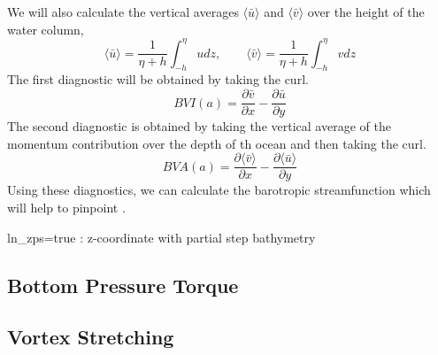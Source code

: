 \documentclass[..\EOYR.tex]{subfiles}
\begin{document}
We will also calculate the vertical averages $\langle\bar{u}\rangle$ and $\langle\bar{v}\rangle$ over the height of the water column, 
\begin{equation}
	\langle\bar{u}\rangle = \frac{1}{\eta + h}\int_{-h}^{\eta}u dz ,\qquad \langle\bar{v}\rangle = \frac{1}{\eta + h}\int_{-h}^{\eta}v dz
\end{equation}
The first diagnostic will be obtained by taking  the curl.
\begin{equation}
	BVI(a) = \frac{\partial \bar{v}}{\partial x} - \frac{\partial \bar{u}}{\partial y}
\end{equation}
The second diagnostic is obtained by taking the vertical average of the momentum contribution over the depth  of th ocean and then taking  the curl. 
\begin{equation}
	BVA(a) = \frac{\partial \langle\bar{v}\rangle}{\partial x} - \frac{\partial \langle\bar{u}\rangle}{\partial y}
\end{equation}
	Using these diagnostics, we can calculate the barotropic  streamfunction which will help to pinpoint .

	ln_zps=true : z-coordinate with partial step bathymetry

	\subsection{Bottom Pressure Torque}
	\subsection{Vortex Stretching}
\end{document}
